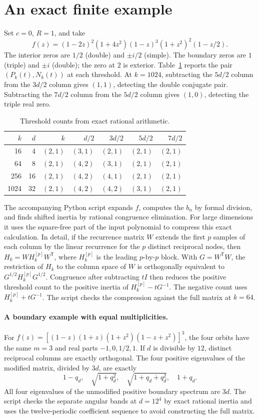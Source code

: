 \documentclass[11pt]{article}
\newcommand{\tr}{^{\mathsf T}}
\begin{document}
\section{An exact finite example}
Set $c=0$, $R=1$, and take
\[
 f(z)=(1-2z)^2(1+4z^2)(1-z)^3(1+z^2)^2(1-z/2).
\]
The interior zeros are $1/2$ (double) and $\pm i/2$ (simple). The boundary zeros are $1$ (triple) and $\pm i$ (double); the zero at $2$ is exterior.
Table~\ref{tab:fixture} reports the pair $(P_k(t),N_k(t))$ at each threshold. At $k=1024$, subtracting the $5d/2$ column from the $3d/2$ column gives $(1,1)$, detecting the double conjugate pair. Subtracting the $7d/2$ column from the $5d/2$ column gives $(1,0)$, detecting the triple real zero.
\begin{table}[ht]
\centering
\caption{Threshold counts from exact rational arithmetic.}\label{tab:fixture}
\begin{tabular}{rrrrrrr}
\toprule
$k$&$d$&$k$&$d/2$&$3d/2$&$5d/2$&$7d/2$\\
\midrule
16&4&$(2,1)$&$(3,1)$&$(2,1)$&$(2,1)$&$(2,1)$\\
64&8&$(2,1)$&$(4,2)$&$(3,1)$&$(2,1)$&$(2,1)$\\
256&16&$(2,1)$&$(4,2)$&$(4,1)$&$(2,1)$&$(2,1)$\\
1024&32&$(2,1)$&$(4,2)$&$(4,2)$&$(3,1)$&$(2,1)$\\
\bottomrule
\end{tabular}
\end{table}

The accompanying Python script expands $f$, computes the $b_n$ by formal division, and finds shifted inertia by rational congruence elimination. For large dimensions it uses the square-free part of the input polynomial to compress this exact calculation. In detail, if the recurrence matrix $W$ extends the first $p$ samples of each column by the linear recurrence for the $p$ distinct reciprocal nodes, then $H_k=W H_k^{[p]}W\tr$, where $H_k^{[p]}$ is the leading $p$-by-$p$ block. With $G=W\tr W$, the restriction of $H_k$ to the column space of $W$ is orthogonally equivalent to $G^{1/2} H_k^{[p]}G^{1/2}$. Congruence after subtracting $tI$ then reduces the positive threshold count to the positive inertia of $H_k^{[p]}-tG^{-1}$. The negative count uses $H_k^{[p]}+tG^{-1}$. The script checks the compression against the full matrix at $k=64$.

\paragraph{A boundary example with equal multiplicities.}
For $f(z)=[(1-z)(1+z)(1+z^2)(1-z+z^2)]^3$, the four orbits have the same $m=3$ and real parts $-1,0,1/2,1$. If $d$ is divisible by $12$, distinct reciprocal columns are exactly orthogonal. The four positive eigenvalues of the modified matrix, divided by $3d$, are exactly
\[
 1-q_d,\quad \sqrt{1+q_d^2},\quad \sqrt{1+q_d+q_d^2},\quad 1+q_d.
\]
All four eigenvalues of the unmodified positive boundary spectrum are $3d$. The script checks the separate angular bands at $d=12^4$ by exact rational inertia and uses the twelve-periodic coefficient sequence to avoid constructing the full matrix.
\end{document}
